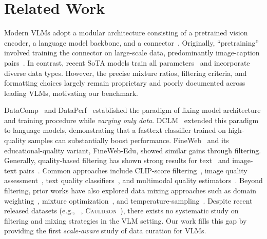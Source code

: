 \section{Related Work}\label{sec:related}

Modern VLMs adopt a modular architecture consisting of a pretrained vision encoder, a language model backbone, and a connector~\citep{liu2023visual,li2024llava,an2025llava,zhu2025internvl3,wang2025internvl3,bai2025qwen25vltechnicalreport,bai2025qwen3,shapourian2026zaya1}.
Originally, ``pretraining'' involved training the connector on large-scale data, predominantly image-caption pairs~\citep{an2025llava}. %
In contrast, recent SoTA models train all parameters~\cite{zhu2025internvl3, wang2025internvl3} and incorporate diverse data types. %
However, the precise mixture ratios, filtering criteria, and formatting choices largely remain proprietary and poorly documented across leading VLMs, motivating our %
benchmark.

DataComp~\citep{gadre2023datacomp} and DataPerf~\citep{mazumder2023dataperf} established the paradigm of fixing model architecture and training procedure while \textit{varying only data}.
DCLM~\citep{li2024datacomp} extended this paradigm to language models, demonstrating that a fasttext classifier trained on high-quality samples can substantially boost performance.
FineWeb~\citep{penedo2024fineweb} and its educational-quality variant, FineWeb-Edu, showed similar gains through filtering. 
Generally, quality-based filtering has shown strong results for text~\citep{penedo2024fineweb,li2024datacomp} and image-text pairs~\citep{gadre2023datacomp,wang2025unifilter}.
Common approaches include CLIP-score filtering~\citep{hessel2021clipscore}, image quality assessment~\citep{mao2026wan,wu2025qwen}, text quality classifiers~\citep{su2025nemotron,deshmukh2025nvidia}, and multimodal quality estimators~\citep{wang2025unifilter}. 
Beyond filtering, prior works have also explored data mixing approaches such as domain weighting~\citep{xie2023doremi,olmo20242}, mixture optimization~\citep{chen2026olmix,berasi2026linear,diao2025nemotron,kang2024autoscale,ye2024data,liu2024regmix}, and temperature-sampling~\citep{deitke2025molmo,clark2026molmo2}. %
Despite recent released datasets (e.g., \fv~\citep{wiedmann2025finevision}, \textsc{Cauldron}~\citep{laurenccon2024matters}), there exists no systematic study on filtering and mixing strategies in the VLM setting.  %
Our work fills this gap by 
providing the first \emph{scale-aware} study of data curation for VLMs.




